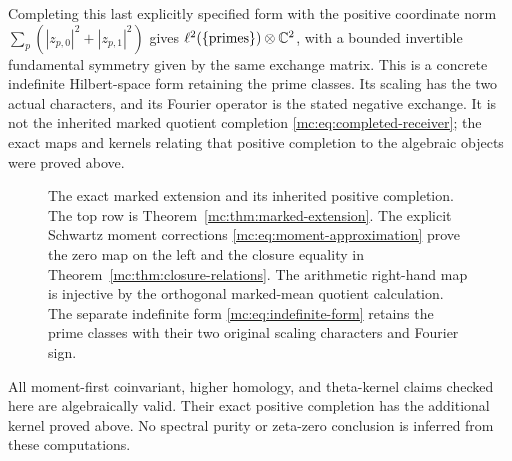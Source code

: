 Completing this last explicitly specified form with the positive
coordinate norm $\sum_p(|z_{p,0}|^2+|z_{p,1}|^2)$ gives
$\ell^2(\{\text{primes}\})\otimes\mathbb C^2$, with a bounded
invertible fundamental symmetry given by the same exchange matrix.
This is a concrete indefinite Hilbert-space form retaining the
prime classes. Its scaling has the two actual characters, and its
Fourier operator is the stated negative exchange. It is not the
inherited marked quotient completion \eqref{mc:eq:completed-receiver};
the exact maps and kernels relating that positive completion to
the algebraic objects were proved above.

\begin{figure}[ht]
\centering
{}
\caption{The exact marked extension and its inherited positive
completion. The top row is Theorem~\ref{mc:thm:marked-extension}.
The explicit Schwartz moment corrections
\eqref{mc:eq:moment-approximation} prove the zero map on the left
and the closure equality in Theorem~\ref{mc:thm:closure-relations}.
The arithmetic right-hand map is injective by the orthogonal
marked-mean quotient calculation. The separate indefinite form
\eqref{mc:eq:indefinite-form} retains the prime classes with their
two original scaling characters and Fourier sign.}
\end{figure}

All moment-first coinvariant, higher homology, and theta-kernel
claims checked here are algebraically valid. Their exact positive
completion has the additional kernel proved above. No spectral
purity or zeta-zero conclusion is inferred from these computations.


